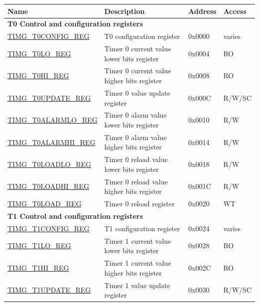 
\begin{longtable}{ | p{5.1cm} | p{7.5cm} | p{1.3cm} | p{1.4cm} | }
    \hline\rowcolor{lightgray}
    \textbf{Name} & \textbf{Description} &  \textbf{Address} & \textbf{Access} \\ \hline
    \endhead
    \multicolumn{4}{|l|}{\textbf{T0 Control and configuration registers}} \\ \hline
    \hyperref[regdesc:TIMGTXCONFIGREG]{TIMG\_T0CONFIG\_REG} & T0 configuration register & 0x0000 & varies \\ \hline
    \hyperref[regdesc:TIMGTXLOREG]{TIMG\_T0LO\_REG} & Timer 0 current value lower bits register & 0x0004 & RO \\ \hline
    \hyperref[regdesc:TIMGTXHIREG]{TIMG\_T0HI\_REG} & Timer 0 current value higher bits register & 0x0008 & RO \\ \hline
    \hyperref[regdesc:TIMGTXUPDATEREG]{TIMG\_T0UPDATE\_REG} & Timer 0 value update register & 0x000C & R/W/SC \\ \hline
    \hyperref[regdesc:TIMGTXALARMLOREG]{TIMG\_T0ALARMLO\_REG} & Timer 0 alarm value lower bits register & 0x0010 & R/W \\ \hline
    \hyperref[regdesc:TIMGTXALARMHIREG]{TIMG\_T0ALARMHI\_REG} & Timer 0 alarm value higher bits register & 0x0014 & R/W \\ \hline
    \hyperref[regdesc:TIMGTXLOADLOREG]{TIMG\_T0LOADLO\_REG} & Timer 0 reload value lower bits register & 0x0018 & R/W \\ \hline
    \hyperref[regdesc:TIMGTXLOADHIREG]{TIMG\_T0LOADHI\_REG} & Timer 0 reload value higher bits register & 0x001C & R/W \\ \hline
    \hyperref[regdesc:TIMGTXLOADREG]{TIMG\_T0LOAD\_REG} & Timer 0 reload register & 0x0020 & WT \\ \hline
    \multicolumn{4}{|l|}{\textbf{T1 Control and configuration registers}} \\ \hline
    \hyperref[regdesc:TIMGTXCONFIGREG]{TIMG\_T1CONFIG\_REG} & T1 configuration register & 0x0024 & varies \\ \hline
    \hyperref[regdesc:TIMGTXLOREG]{TIMG\_T1LO\_REG} & Timer 1 current value lower bits register & 0x0028 & RO \\ \hline
    \hyperref[regdesc:TIMGTXHIREG]{TIMG\_T1HI\_REG} & Timer 1 current value higher bits register & 0x002C & RO \\ \hline
    \hyperref[regdesc:TIMGTXUPDATEREG]{TIMG\_T1UPDATE\_REG} & Timer 1 value update register & 0x0030 & R/W/SC \\ \hline

\end{longtable}
